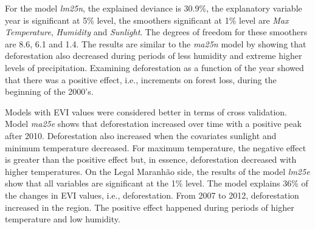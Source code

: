 For the model \textit{lm25n}, the explained deviance is 30.9\%, the explanatory variable year is significant at 5\% level, the smoothers significant at 1\% level are \textit{Max Temperature}, \textit{Humidity} and \textit{Sunlight}. The degrees of freedom for these smoothers are 8.6, 6.1 and 1.4. The results are similar to the \textit{ma25n} model by showing that deforestation also decreased during periods of less humidity and extreme higher levels of precipitation. Examining deforestation as a function of the year showed that there was a positive effect, i.e., increments on forest loss, during the beginning of the 2000's.



Models with EVI values were considered better in terms of cross validation. Model \textit{ma25e} shows that deforestation increased over time with a positive peak after 2010. Deforestation also increased when the covariates sunlight and minimum temperature decreased. For maximum temperature, the negative effect is greater than the positive effect but, in essence, deforestation decreased with higher temperatures. On the Legal Maranhão side, the results of the model \textit{lm25e} show that all variables are significant at the 1\% level. The model explains 36\% of the changes in EVI values, i.e., deforestation. From 2007 to 2012, deforestation increased in the region. The positive effect happened during periods of higher temperature and low humidity. 






